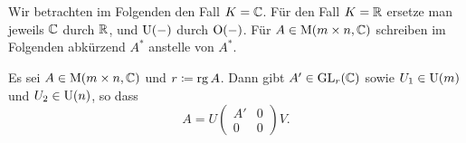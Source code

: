 \section{}
Wir betrachten im Folgenden den Fall $K = \mathbb{C}$.
Für den Fall $K = \mathbb{R}$ ersetze man jeweils $\mathbb{C}$ durch $\mathbb{R}$, und $\operatorname{U}(-)$ durch $\operatorname{O}(-)$.
Für $A \in \operatorname{M}(m \times n, \mathbb{C})$ schreiben im Folgenden abkürzend $A^*$ anstelle von $A^*$.

\begin{lemma}
  \label{lemma: decomposition}
  Es sei $A \in \operatorname{M}(m \times n, \mathbb{C})$ und $r \coloneqq \operatorname{rg} A$.
  Dann gibt $A' \in \operatorname{GL}_{r}(\mathbb{C})$ sowie $U_1 \in \operatorname{U}(m)$ und $U_2 \in \operatorname{U}(n)$, so dass
  \[
    A = U
        \begin{pmatrix}
          A'  & 0 \\
          0   & 0
        \end{pmatrix}
        V.
  \]
\end{lemma}
